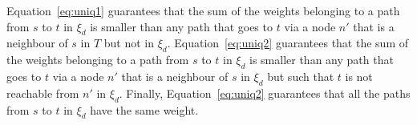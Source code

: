 Equation~\ref{eq:uniq1} guarantees that 
the sum of the weights belonging to a path from $s$ to $t$ in $\xi_d$ is smaller than 
any path that goes to $t$ via a node $n'$ that is a neighbour of $s$ in $T$ but not in $\xi_d$.
Equation~\ref{eq:uniq2} guarantees that
the sum of the weights belonging to a path from $s$ to $t$ in $\xi_d$ is smaller than 
any path that goes to $t$ via a node $n'$ that is a neighbour of $s$ in $\xi_d$ but such that
$t$ is not reachable from $n'$ in $\xi_d$.
Finally, Equation~\ref{eq:uniq2} guarantees that all the paths from $s$ to $t$ in $\xi_d$ have the same weight.


